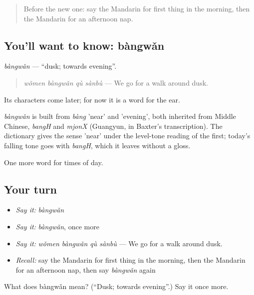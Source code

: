 \begin{quote}
Before the new one: say the Mandarin for first thing in the morning, then the Mandarin for an afternoon nap.
\end{quote}

\subsection*{You'll want to know: bàngwǎn}
\emph{bàngwǎn} — \textquotedblleft{}dusk; towards evening\textquotedblright{}.

\begin{quote}
\emph{wǒmen bàngwǎn qù sànbù} — We go for a walk around dusk.
\end{quote}

Its characters come later; for now it is a word for the ear.

\begin{cousinweb}
\emph{bàngwǎn} is built from \emph{bàng} 'near' and  'evening', both inherited from Middle Chinese, \emph{bangH} and \emph{mjonX} (Guangyun, in Baxter's transcription). The dictionary gives the sense 'near' under the level-tone reading of the first; today's falling tone goes with \emph{bangH}, which it leaves without a gloss.
\end{cousinweb}

\begin{grammarlens}[title={What you've built}]
One more word for times of day.
\end{grammarlens}

\subsection*{Your turn}
\begin{itemize}
\raggedright
  \item \emph{Say it:} \emph{bàngwǎn}
  \item \emph{Say it:} \emph{bàngwǎn}, once more
  \item \emph{Say it:} \emph{wǒmen bàngwǎn qù sànbù} — We go for a walk around dusk.
  \item \emph{Recall:} say the Mandarin for first thing in the morning, then the Mandarin for an afternoon nap, then say \emph{bàngwǎn} again
\end{itemize}

\begin{tcolorbox}[breakable,colback=teal!4,colframe=teal!35!black,title={Before you move on}]
What does bàngwǎn mean? (\textquotedblleft{}Dusk; towards evening\textquotedblright{}.) Say it once more.
\end{tcolorbox}
